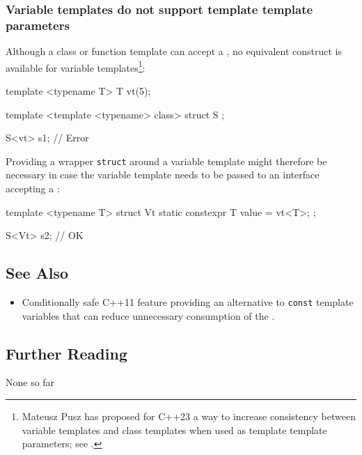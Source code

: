 \subsubsection[Variable templates do not support template template parameters]{Variable templates do not support template template parameters}\label{variable-templates-do-not-support-template-template-parameters}

Although a class or function template can accept a
, no equivalent
construct is available for variable templates{\cprotect\footnote{Mateusz Pusz has proposed for C++23 a way to increase consistency between
variable templates and class templates when used as template template
  parameters; see \cite{pusz20}.}}:

\begin{emcppslisting}[emcppsbatch=e7]
template <typename T> T vt(5);

template <template <typename> class>
struct S { };

S<vt> s1;  // Error
\end{emcppslisting}
    
\noindent Providing a wrapper \lstinline!struct!
around a variable template might therefore be necessary in case the variable template needs to be passed to an interface
accepting a :

\begin{emcppslisting}[emcppsbatch=e7]
template <typename T>
struct Vt { static constexpr T value = vt<T>; };

S<Vt> s2;  // OK
\end{emcppslisting}
    

\subsection[See Also]{See Also}\label{see-also}

\begin{itemize}
\item{%
Conditionally safe C++11 feature providing an alternative to \lstinline!const! template variables that can reduce unnecessary consumption of the .}
\end{itemize}

\subsection[Further Reading]{Further Reading}\label{further-reading}

None so far


